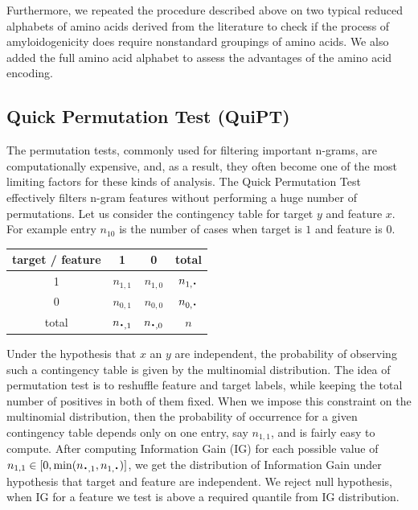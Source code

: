 \documentclass[a4,center,fleqn]{NAR}
\newcommand*{\bigcdot}{\raisebox{-0.25ex}{\scalebox{1.5}{$\cdot$}}}
\begin{document}
  Furthermore, we repeated the procedure described above on two typical reduced 
alphabets of amino acids derived from the literature to check if the process of 
%
%
%
%
%
amyloidogenicity does require nonstandard groupings of amino acids. We also 
added the full amino acid alphabet to assess the advantages of the amino acid 
encoding.

\subsection{Quick Permutation Test (QuiPT)}

The permutation tests, commonly used for filtering important n-grams, are 
computationally expensive, and, as a result, they often become one of the most
limiting factors for these kinds of analysis. 
The Quick Permutation Test effectively filters 
n-gram features without performing a huge number of permutations. Let us 
consider the contingency table for target $y$ and feature $x$. For example 
entry $n_{10}$ is the number of cases when target is $1$ and feature is $0$.

\begin{center}
\begin{tabular}{ | c || c | c | c | }
  \hline			
  target / feature & 1 & 0 & total\\ \hline
 1 & $n_{1,1}$ & $n_{1,0}$ & $n_{1,\bigcdot}$ \\
 0 & $n_{0,1}$ & $n_{0,0}$ & $n_{0,\bigcdot}$ \\ \hline
 total & $n_{\bigcdot,1}$ & $n_{\bigcdot,0}$ & $n$ \\
  \hline  
\end{tabular} 
\end{center}

  Under the hypothesis that $x$ an $y$ are independent, the probability of 
observing such a contingency table is given by the multinomial distribution. The 
idea of permutation test is to reshuffle feature and target labels, while 
keeping the total number of positives in both of them fixed. When we impose this 
constraint on the multinomial distribution, then the probability of occurrence 
for a given contingency table depends only on one entry, say $n_{1,1}$, and is 
fairly easy to compute. After computing Information Gain (IG) for each possible 
value of $n_{1,1} \in [0,\min(n_{\bigcdot, 1}, n_{1, \bigcdot})]$, we get the 
distribution of Information Gain under hypothesis that target and feature are 
independent. We reject null hypothesis, when IG for a feature we test is above a 
required quantile from IG distribution.
\end{document}
